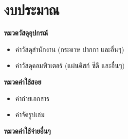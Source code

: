 \section{งบประมาณ}

\noindent\textbf{หมวดวัสดุอุปกรณ์}
\begin{itemize}[leftmargin=1.8cm]
\item ค่าวัสดุสำนักงาน (กระดาษ ปากกา และอื่นๆ)
\item ค่าวัสดุคอมพิวเตอร์ (แผ่นดิสก์ ซีดี และอื่นๆ)
\end{itemize}

\noindent\textbf{หมวดค่าใช้สอย}
\begin{itemize}[leftmargin=1.8cm]
\item ค่าถ่ายเอกสาร
\item ค่าจัดรูปเล่ม
\end{itemize}

\noindent\textbf{หมวดค่าใช้จ่ายอื่นๆ}
